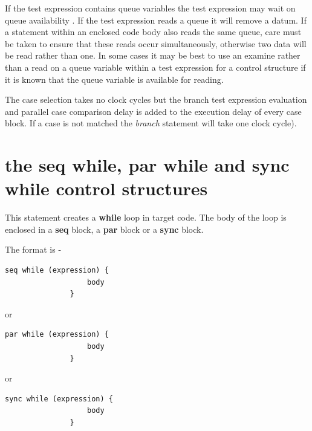             If the test expression contains queue variables the test expression
            may wait on queue availability . If the test
            expression reads a queue it will remove a datum. If a statement
            within an enclosed code body also reads the same queue, care must be
            taken to ensure that these reads occur simultaneously, otherwise two
            data will be read rather than one. In some cases it may be best to
            use an examine rather than a read on a queue variable within a test
            expression for a control structure if it is known that the queue
            variable is available for reading.

            The case selection takes no clock cycles but the branch test
            expression evaluation and parallel case comparison delay is added to
            the execution delay of every case block. If a case is not matched
            the {\em branch} statement will take one clock cycle).
            


    \section{the {\bf seq while}, {\bf par while} and {\bf sync while}
                                                        control structures}

        This statement creates a {\bf while} loop in target code. The body
        of the loop is enclosed in a {\bf seq} block, a {\bf par} block or a
        {\bf sync} block.
        
        The format is -
        \begin{lstlisting}[gobble=8, language=threepl]
               seq while (expression) {
                   body
               }
        \end{lstlisting}
        or
        \begin{lstlisting}[gobble=8, language=threepl]
               par while (expression) {
                   body
               }
        \end{lstlisting}
        or
        \begin{lstlisting}[gobble=8, language=threepl]
               sync while (expression) {
                   body
               }
        \end{lstlisting}

